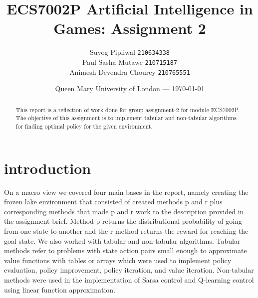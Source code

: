 \documentclass[11pt]{article}
\title{ECS7002P Artificial Intelligence in Games: Assignment 2} %
\author{Suyog Pipliwal \texttt{210634338}\\ 
			Paul Sasha Mutawe \texttt{210715187} \\ 
			Animesh Devendra Chourey \texttt{210765551}
} %
\date{Queen Mary University of London --- \today} %
\begin{document}
	\maketitle
\begin{abstract}
	This report is a reflection of work done for group assignment-2 for module ECS7002P. The objective of this assignment is to implement tabular and non-tabular algorithms for finding optimal policy for the given environment. 
\end{abstract}
\section{introduction}
     On a macro view we covered four main bases in the report, namely creating the frozen lake environment that consisted of created methods p and r plus corresponding methods that made p and r work to the description provided in the assignment brief. Method p returns the distributional probability of going from one state to another and the r method returns the reward for reaching the goal state. We also worked with tabular and non-tabular algorithms. Tabular methods refer to problems with state action pairs small enough to approximate value functions with tables or arrays which were used to implement policy evaluation, policy improvement, policy iteration, and value iteration. Non-tabular methods were used in the implementation of Sarsa control and Q-learning control using linear function approximation.
\end{document}
